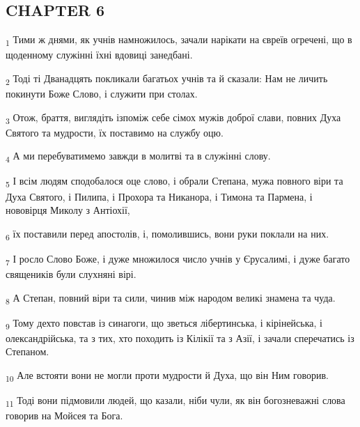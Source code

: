 \subsection{CHAPTER 6}
\begin{tcolorbox}
\textsubscript{1} Тими ж днями, як учнів намножилось, зачали нарікати на євреїв огречені, що в щоденному служінні їхні вдовиці занедбані.
\end{tcolorbox}
\begin{tcolorbox}
\textsubscript{2} Тоді ті Дванадцять покликали багатьох учнів та й сказали: Нам не личить покинути Боже Слово, і служити при столах.
\end{tcolorbox}
\begin{tcolorbox}
\textsubscript{3} Отож, браття, виглядіть ізпоміж себе сімох мужів доброї слави, повних Духа Святого та мудрости, їх поставимо на службу оцю.
\end{tcolorbox}
\begin{tcolorbox}
\textsubscript{4} А ми перебуватимемо завжди в молитві та в служінні слову.
\end{tcolorbox}
\begin{tcolorbox}
\textsubscript{5} І всім людям сподобалося оце слово, і обрали Степана, мужа повного віри та Духа Святого, і Пилипа, і Прохора та Никанора, і Тимона та Пармена, і нововірця Миколу з Антіохії,
\end{tcolorbox}
\begin{tcolorbox}
\textsubscript{6} їх поставили перед апостолів, і, помолившись, вони руки поклали на них.
\end{tcolorbox}
\begin{tcolorbox}
\textsubscript{7} І росло Слово Боже, і дуже множилося число учнів у Єрусалимі, і дуже багато священиків були слухняні вірі.
\end{tcolorbox}
\begin{tcolorbox}
\textsubscript{8} А Степан, повний віри та сили, чинив між народом великі знамена та чуда.
\end{tcolorbox}
\begin{tcolorbox}
\textsubscript{9} Тому дехто повстав із синагоги, що зветься лібертинська, і кірінейська, і олександрійська, та з тих, хто походить із Кілікії та з Азії, і зачали сперечатись із Степаном.
\end{tcolorbox}
\begin{tcolorbox}
\textsubscript{10} Але встояти вони не могли проти мудрости й Духа, що він Ним говорив.
\end{tcolorbox}
\begin{tcolorbox}
\textsubscript{11} Тоді вони підмовили людей, що казали, ніби чули, як він богозневажні слова говорив на Мойсея та Бога.
\end{tcolorbox}
